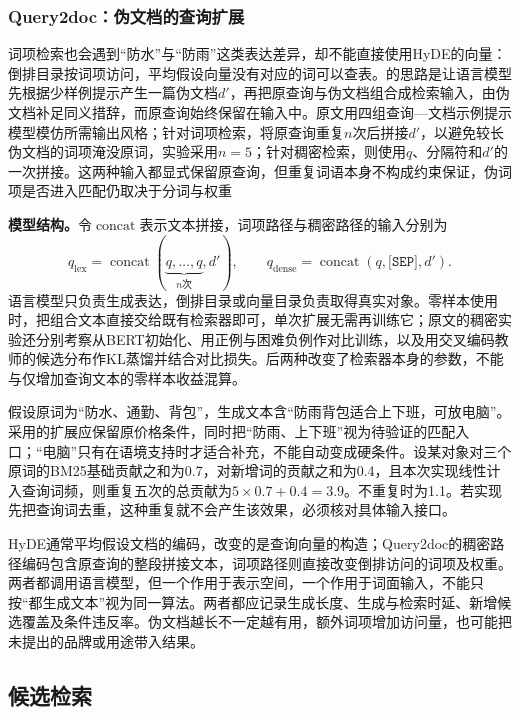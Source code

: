 \Needspace{100mm}
\subsubsection{Query2doc：伪文档的查询扩展}
\label{sec:rs-search-query2doc}

词项检索也会遇到“防水”与“防雨”这类表达差异，却不能直接使用HyDE的向量：倒排目录按词项访问，平均假设向量没有对应的词可以查表。的思路是让语言模型先根据少样例提示产生一篇伪文档$d'$，再把原查询与伪文档组合成检索输入，由伪文档补足同义措辞，而原查询始终保留在输入中。原文用四组查询—文档示例提示模型模仿所需输出风格；针对词项检索，将原查询重复$n$次后拼接$d'$，以避免较长伪文档的词项淹没原词，实验采用$n=5$；针对稠密检索，则使用$q$、分隔符和$d'$的一次拼接。这两种输入都显式保留原查询，但重复词语本身不构成约束保证，伪词项是否进入匹配仍取决于分词与权重

\textbf{模型结构。}令$\operatorname{concat}$表示文本拼接，词项路径与稠密路径的输入分别为
\[
 q_{\mathrm{lex}}=\operatorname{concat}(\underbrace{q,\ldots,q}_{n\text{次}},d'),
 \qquad
 q_{\mathrm{dense}}=\operatorname{concat}(q,\texttt{[SEP]},d').
\]
语言模型只负责生成表达，倒排目录或向量目录负责取得真实对象。零样本使用时，把组合文本直接交给既有检索器即可，单次扩展无需再训练它；原文的稠密实验还分别考察从BERT初始化、用正例与困难负例作对比训练，以及用交叉编码教师的候选分布作KL蒸馏并结合对比损失。后两种改变了检索器本身的参数，不能与仅增加查询文本的零样本收益混算。

假设原词为“防水、通勤、背包”，生成文本含“防雨背包适合上下班，可放电脑”。采用的扩展应保留原价格条件，同时把“防雨、上下班”视为待验证的匹配入口；“电脑”只有在语境支持时才适合补充，不能自动变成硬条件。设某对象对三个原词的BM25基础贡献之和为0.7，对新增词的贡献之和为0.4，且本次实现线性计入查询词频，则重复五次的总贡献为$5\times0.7+0.4=3.9$。不重复时为1.1。若实现先把查询词去重，这种重复就不会产生该效果，必须核对具体输入接口。

HyDE通常平均假设文档的编码，改变的是查询向量的构造；Query2doc的稠密路径编码包含原查询的整段拼接文本，词项路径则直接改变倒排访问的词项及权重。两者都调用语言模型，但一个作用于表示空间，一个作用于词面输入，不能只按“都生成文本”视为同一算法。两者都应记录生成长度、生成与检索时延、新增候选覆盖及条件违反率。伪文档越长不一定越有用，额外词项增加访问量，也可能把未提出的品牌或用途带入结果。

\subsection{候选检索}
\label{sec:rs-search-retrieval}

